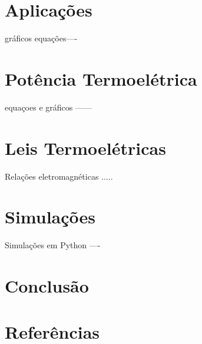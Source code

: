 \documentclass[a4paper,12pt]{article}
\begin{document}
\pagebreak

\section{Aplicações}

gráficos equações----
\section{Potência Termoelétrica}

equaçoes e gráficos ------
\section{Leis Termoelétricas}

Relações eletromagnéticas .....

\section{Simulações}

Simulações em Python ----

\section{Conclusão}

\section{Referências}
\nocite{*}


%
\end{document}
